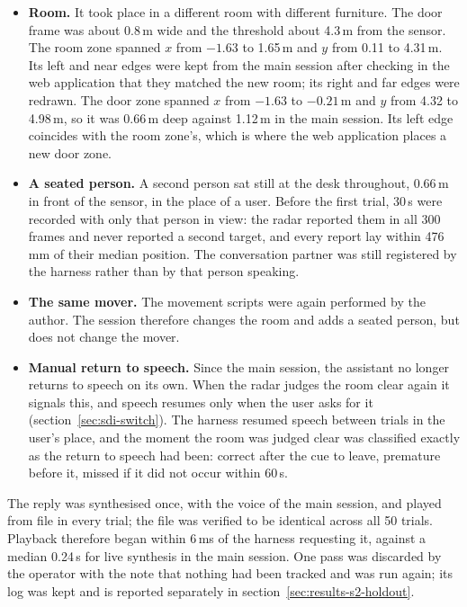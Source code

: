\begin{itemize}
  \item \textbf{Room.} It took place in a different room with different
  furniture. The door frame was about 0.8\,m wide and the threshold about
  4.3\,m from the sensor. The room zone spanned $x$ from $-1.63$ to 1.65\,m
  and $y$ from 0.11 to 4.31\,m. Its left and near edges were kept from the
  main session after checking in the web application that they matched the
  new room; its right and far edges were redrawn. The door zone spanned $x$
  from $-1.63$ to $-0.21$\,m and $y$ from 4.32 to 4.98\,m, so it was
  0.66\,m deep against 1.12\,m in the main session. Its left edge coincides
  with the room zone's, which is where the web application places a new door
  zone.
  \item \textbf{A seated person.} A second person sat still at the desk
  throughout, 0.66\,m in front of the sensor, in the place of a user. Before
  the first trial, 30\,s were recorded with only that person in view: the
  radar reported them in all 300 frames and never reported a second target,
  and every report lay within 476\,mm of their median position. The
  conversation partner was still registered by the harness rather than by
  that person speaking.
  \item \textbf{The same mover.} The movement scripts were again performed by
  the author. The session therefore changes the room and adds a seated
  person, but does not change the mover.
  \item \textbf{Manual return to speech.} Since the main session, the
  assistant no longer returns to speech on its own. When the radar judges the
  room clear again it signals this, and speech resumes only when the user
  asks for it (section~\ref{sec:sdi-switch}). The harness resumed speech
  between trials in the user's place, and the moment the room was judged
  clear was classified exactly as the return to speech had been: correct
  after the cue to leave, premature before it, missed if it did not occur
  within 60\,s.
\end{itemize}

The reply was synthesised once, with the voice of the main session, and
played from file in every trial; the file was verified to be identical across
all 50 trials. Playback therefore began within 6\,ms of the harness requesting
it, against a median 0.24\,s for live synthesis in the main session. One pass
was discarded by the operator with the note that nothing had been tracked and
was run again; its log was kept and is reported separately in
section~\ref{sec:results-s2-holdout}.

